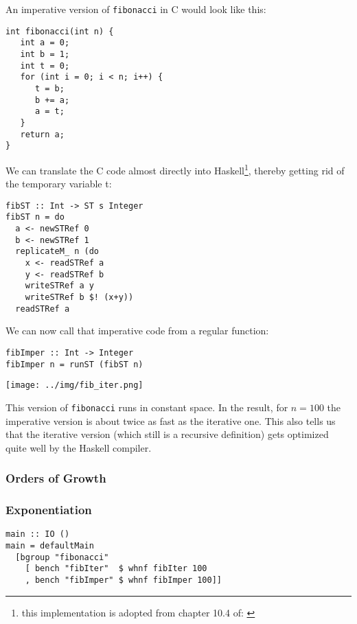 \documentclass{scrartcl}
\numberwithin{equation}{section}
\begin{document}
An imperative version of \texttt{fibonacci} in C would look like this:
\begin{verbatim}
int fibonacci(int n) {
   int a = 0;
   int b = 1;
   int t = 0;
   for (int i = 0; i < n; i++) {
      t = b;
      b += a;
      a = t;
   }
   return a;
}
\end{verbatim}

We can translate the C code almost directly into Haskell\footnote{this implementation is adopted from chapter 10.4 of: \cite{tfwh15}}, thereby getting rid of the temporary variable t:

\begin{verbatim}
fibST :: Int -> ST s Integer
fibST n = do
  a <- newSTRef 0
  b <- newSTRef 1
  replicateM_ n (do 
    x <- readSTRef a
    y <- readSTRef b
    writeSTRef a y
    writeSTRef b $! (x+y))
  readSTRef a
\end{verbatim}

We can now call that imperative code from a regular function:

\begin{verbatim}
fibImper :: Int -> Integer 
fibImper n = runST (fibST n)
\end{verbatim}

\texttt{[image: ../img/fib\_iter.png]}

This version of \texttt{fibonacci} runs in constant space. In the result, for $n=100$ the imperative version is about twice as fast as the iterative one. This also tells us that the iterative version (which still is a recursive definition) gets optimized quite well by the Haskell compiler.

\subsubsection{Orders of Growth}

\subsubsection{Exponentiation}

\begin{verbatim}
main :: IO ()
main = defaultMain 
  [bgroup "fibonacci"
    [ bench "fibIter"  $ whnf fibIter 100
    , bench "fibImper" $ whnf fibImper 100]]
\end{verbatim}

\printbibliography
\end{document}
